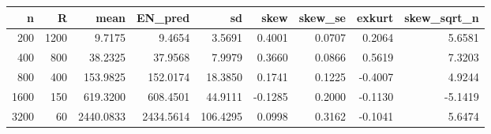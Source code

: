 \begin{tabular}{rrrrrrrrr}
\toprule
n & R & mean & EN_pred & sd & skew & skew_se & exkurt & skew_sqrt_n \\
\midrule
200 & 1200 & 9.7175 & 9.4654 & 3.5691 & 0.4001 & 0.0707 & 0.2064 & 5.6581 \\
400 & 800 & 38.2325 & 37.9568 & 7.9979 & 0.3660 & 0.0866 & 0.5619 & 7.3203 \\
800 & 400 & 153.9825 & 152.0174 & 18.3850 & 0.1741 & 0.1225 & -0.4007 & 4.9244 \\
1600 & 150 & 619.3200 & 608.4501 & 44.9111 & -0.1285 & 0.2000 & -0.1130 & -5.1419 \\
3200 & 60 & 2440.0833 & 2434.5614 & 106.4295 & 0.0998 & 0.3162 & -0.1041 & 5.6474 \\
\bottomrule
\end{tabular}
